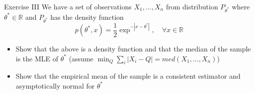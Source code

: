 \documentclass{beamer}
\begin{document}
\begin{frame}{Exercise III} 
We have a set of observations $X_1, \ldots, X_n$ from distribution $P_{\theta^*}$ where $\theta^* \in \mathbb{R}$ and  $P_{\theta^*}$ has the density function 
\begin{displaymath} 
p(\theta^*, x) = \frac{1}{2} \exp^{-|x - \theta^*|}, \quad \forall x \in \mathbb{R} 
\end{displaymath}
\begin{itemize} 
 \item Show that the above is a density function and that the median of the sample is the MLE of $\theta^*$ (assume $\min_Q \sum_i |X_i - Q| = med(X_1,\ldots,X_n)$)  
 \item Show that the empirical mean of the sample is a consistent estimator and asymptotically normal for $\theta^*$ 
\end{itemize}
\end{frame}
\end{document}
